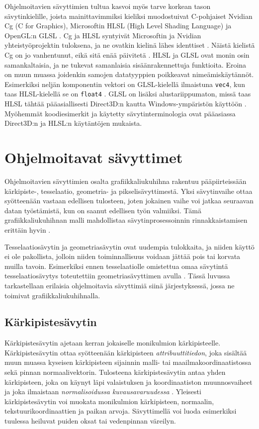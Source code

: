\documentclass[finnish]{tktltiki2}
\theoremstyle{definition}
\theoremstyle{remark}
\begin{document}
Ohjelmoitavien sävyttimien tultua kasvoi myös tarve korkean tason sävytinkielille, joista mainittavimmiksi kieliksi muodostuivat C-pohjaiset Nvidian Cg (C for Graphics), Microsoftin HLSL (High Level Shading Language) ja OpenGL:n GLSL \cite{Nvi03} \cite{Mic11} \cite{Khr15}. Cg ja HLSL syntyivät Microsoftin ja Nvidian yhteistyöprojektin tuloksena, ja ne ovatkin kielinä lähes identtiset \cite[s. 198]{She08}. Näistä kielistä Cg on jo vanhentunut, eikä sitä enää päivitetä \cite{Nvi12}. HLSL ja GLSL ovat monin osin samankaltaisia, ja ne tukevat samanlaisia sisäänrakennettuja funktioita. Eroina on muun muassa joidenkin samojen datatyyppien poikkeavat nimeämiskäytännöt. Esimerkiksi neljän komponentin vektori on GLSL-kielellä ilmaistuna \texttt{vec4}, kun taas HLSL-kielellä se on \texttt{float4} \cite[s. 198]{She08}. GLSL on lisäksi alustariippumaton, missä taas HLSL tähtää pääasiallisesti Direct3D:n kautta Windows-ympäristön käyttöön \cite{Khr15} \cite{Mic11}. Myöhemmät koodiesimerkit ja käytetty sävytinterminologia ovat pääasiassa Direct3D:n ja HLSL:n käytäntöjen mukaista.

\section{Ohjelmoitavat sävyttimet}

Ohjelmoitavien sävyttimien osalta grafiikkaliukuhihna rakentuu pääpiirteissään kärkipiste-, tesselaatio, geometria- ja pikselisävyttimestä. Yksi sävytinvaihe ottaa syötteenään vastaan edellisen tulosteen, joten jokainen vaihe voi jatkaa seuraavan datan työstämistä, kun on saanut edellisen työn valmiiksi. Tämä grafiikkaliukuhihnan malli mahdollistaa sävytinprosessoinnin rinnakkaistamisen erittäin hyvin \cite[s. 10-12]{Ake02}. 

Tesselaatiosävytin ja geometriasävytin ovat uudempia tulokkaita, ja niiden käyttö ei ole pakollista, jolloin niiden toiminnallisuus voidaan jättää pois tai korvata muilla tavoin. Esimerkiksi ennen tesselaatiolle omistettua omaa sävytintä tesselaatiosävytys toteutettiin geometriasävyttimen avulla \cite{Sch14}. Tässä luvussa tarkastellaan erilaisia ohjelmoitavia sävyttimiä siinä järjestyksessä, jossa ne toimivat grafiikkaliukuhihnalla.

\subsection{Kärkipistesävytin}

Kärkipistesävytin ajetaan kerran jokaiselle monikulmion kärkipisteelle. Kärkipistesävytin ottaa syötteenään kärkipisteen \emph{attribuuttitiedon}, joka sisältää muun muassa kyseisen kärkipisteen sijainnin malli- tai maailmakoordinaatistossa sekä pinnan normaalivektorin. Tulosteena kärkipistesävytin antaa yhden kärkipisteen, joka on käynyt läpi valaistuksen ja koordinaatiston muunnosvaiheet ja joka ilmaistaan \emph{normalisoidussa kuvausavaruudessa} \cite[s. 500]{Gre14}. Yleisesti kärkipistesävytin voi muokata monikulmion kärkipisteen, normaalin, tekstuurikoordinaattien ja paikan arvoja. Sävyttimellä voi luoda esimerkiksi tuulessa heiluvat puiden oksat tai vedenpinnan väreilyn.
\end{document}
